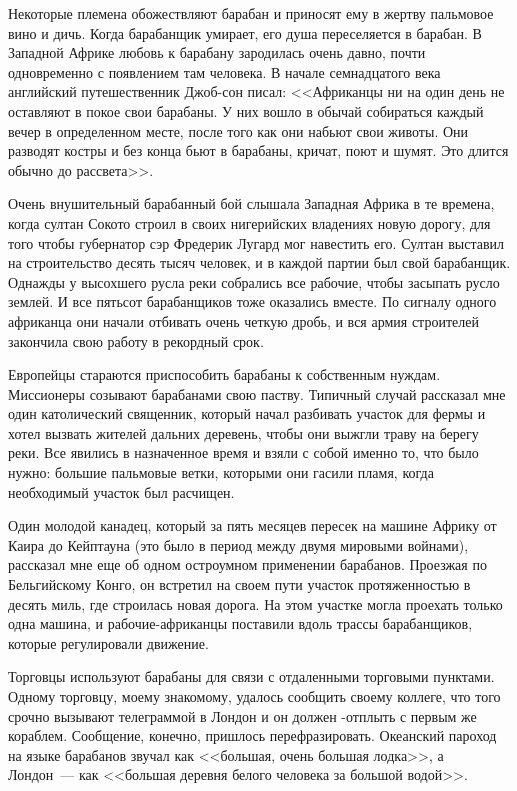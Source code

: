 \documentclass[12pt,a4paper,twoside,openany,svgnames]{memoir}
\begin{document}
Некоторые племена обожествляют барабан и приносят ему в жертву пальмовое вино и дичь. Когда барабанщик умирает, его душа переселяется в барабан. В Западной Африке любовь к барабану зародилась очень давно, почти одновременно с появлением там человека. В начале семнадцатого века английский путешественник Джоб-сон писал: <<Африканцы ни на один день не оставляют в покое свои барабаны. У них вошло в обычай собираться каждый вечер в определенном месте, после того как они набьют свои животы. Они разводят костры и без конца бьют в барабаны, кричат, поют и шумят. Это длится обычно до рассвета>>.

Очень внушительный барабанный бой слышала Западная Африка в те времена, когда султан Сокото строил в своих нигерийских владениях новую дорогу, для того чтобы губернатор сэр Фредерик Лугард мог навестить его. Султан выставил на строительство десять тысяч человек, и в каждой партии был свой барабанщик. Однажды у высохшего русла реки собрались все рабочие, чтобы засыпать русло землей. И все пятьсот барабанщиков тоже оказались вместе. По сигналу одного африканца они начали отбивать очень четкую дробь, и вся армия строителей закончила свою работу в рекордный срок.

Европейцы стараются приспособить барабаны к собственным нуждам. Миссионеры созывают барабанами свою паству. Типичный случай рассказал мне один католический священник, который начал разбивать участок для фермы и хотел вызвать жителей дальних деревень, чтобы они выжгли траву на берегу реки. Все явились в назначенное время и взяли с собой именно то, что было нужно: большие пальмовые ветки, которыми они гасили пламя, когда необходимый участок был расчищен.

Один молодой канадец, который за пять месяцев пересек на машине Африку от Каира до Кейптауна (это было в период между двумя мировыми войнами), рассказал мне еще об одном остроумном применении барабанов. Проезжая по Бельгийскому Конго, он встретил на своем пути участок протяженностью в десять миль, где строилась новая дорога. На этом участке могла проехать только одна машина, и рабочие-африканцы поставили вдоль трассы барабанщиков, которые регулировали движение.

Торговцы используют барабаны для связи с отдаленными торговыми пунктами. Одному торговцу, моему знакомому, удалось сообщить своему коллеге, что того срочно вызывают телеграммой в Лондон и он должен -отплыть с первым же кораблем. Сообщение, конечно, пришлось перефразировать. Океанский пароход на языке барабанов звучал как <<большая, очень большая лодка>>, а Лондон~--- как <<большая деревня белого человека за большой водой>>.
\end{document}
